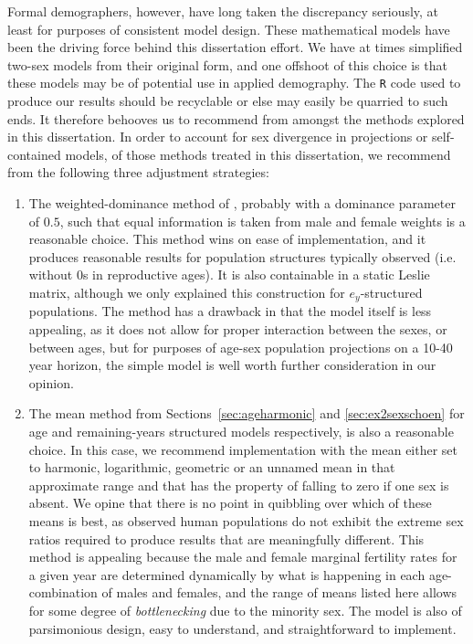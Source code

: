 Formal demographers, however, have long taken the discrepancy seriously, at
least for purposes of consistent model design. These mathematical models
have been the driving force behind this dissertation effort. We have at
times simplified two-sex models from their original form, and one offshoot of
this choice is that these models may be of potential use in applied demography.
The \texttt{R} code used to produce our results should be recyclable or else may
easily be quarried to such ends. It therefore behooves us to recommend from
amongst the methods explored in this dissertation. In order to account for sex
divergence in projections or self-contained models, of those methods treated in this dissertation, 
we recommend from the following three adjustment strategies:

\begin{enumerate}
\item The weighted-dominance method of \citet{goodman1967age}, probably with
a dominance parameter of $0.5$, such that equal information is taken from male and female
weights is a reasonable choice. This method wins on ease of implementation, and
it produces reasonable results for population structures typically observed (i.e. without 0s in
reproductive ages). It is also containable in a static Leslie matrix, although
we only explained this construction for $e_y$-structured populations. The
method has a drawback in that the model itself is less appealing, as it does 
not allow for proper interaction between the sexes, or between ages, but for
purposes of age-sex population projections on a 10-40 year horizon, the simple
model is well worth further consideration in our opinion.

\item The mean method from Sections~\ref{sec:ageharmonic} and
\ref{sec:ex2sexschoen} for age and remaining-years structured models
respectively, is also a reasonable choice. In this case, we recommend
implementation with the mean either set to harmonic, logarithmic, geometric or
an unnamed mean in that approximate range and that has the property of 
falling to zero if one sex is absent. We opine that there is no point in
quibbling over which of these means is best, as observed human populations do
not exhibit the extreme sex ratios required to produce results that are
meaningfully different. This method is appealing because the male and female
marginal fertility rates for a given year are determined dynamically by 
what is happening in each age-combination of males and females, and the range
of means listed here allows for some degree of \textit{bottlenecking} due to
the minority sex. The model is also of parsimonious design, easy to understand,
and straightforward to implement.


\end{enumerate}
